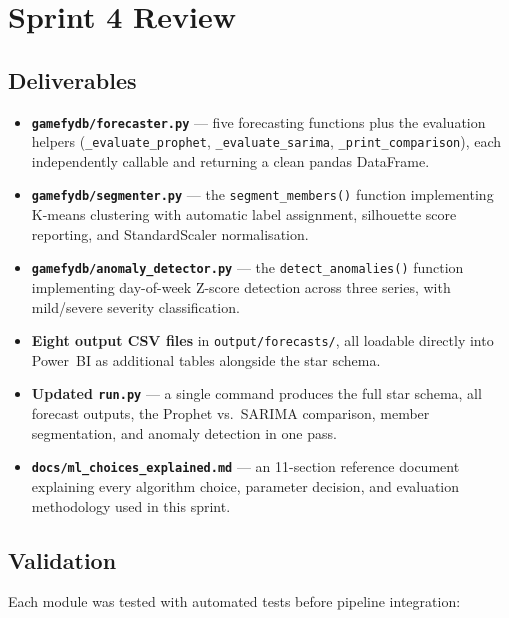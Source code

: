 \section{Sprint 4 Review}

\subsection{Deliverables}

\begin{itemize}
  \item \textbf{\texttt{gamefydb/forecaster.py}} --- five forecasting functions plus
        the evaluation helpers (\texttt{\_evaluate\_prophet},
        \texttt{\_evaluate\_sarima}, \texttt{\_print\_comparison}), each independently
        callable and returning a clean pandas DataFrame.
  \item \textbf{\texttt{gamefydb/segmenter.py}} --- the \texttt{segment\_members()}
        function implementing K-means clustering with automatic label assignment,
        silhouette score reporting, and StandardScaler normalisation.
  \item \textbf{\texttt{gamefydb/anomaly\_detector.py}} --- the
        \texttt{detect\_anomalies()} function implementing day-of-week Z-score
        detection across three series, with mild/severe severity classification.
  \item \textbf{Eight output CSV files} in \texttt{output/forecasts/}, all loadable
        directly into Power~BI as additional tables alongside the star schema.
  \item \textbf{Updated \texttt{run.py}} --- a single command produces the full star
        schema, all forecast outputs, the Prophet vs.\ SARIMA comparison, member
        segmentation, and anomaly detection in one pass.
  \item \textbf{\texttt{docs/ml\_choices\_explained.md}} --- an 11-section reference
        document explaining every algorithm choice, parameter decision, and evaluation
        methodology used in this sprint.
\end{itemize}

\subsection{Validation}

Each module was tested with automated tests before pipeline integration:

